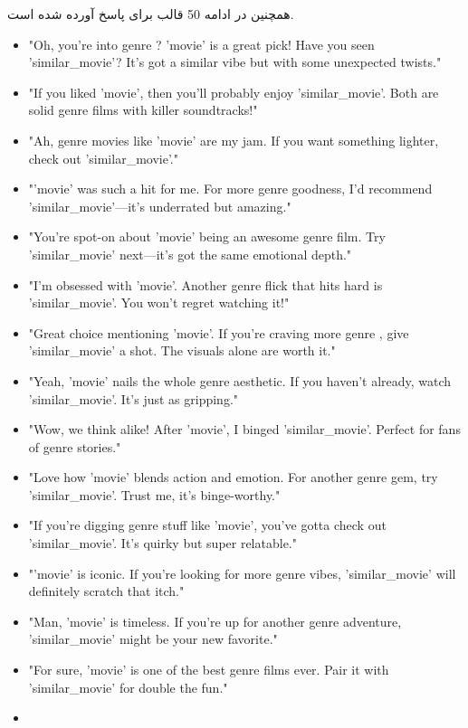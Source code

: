 همچنین در ادامه 50 قالب برای پاسخ آورده شده است.

\begin{LTR}
\begin{itemize}
\item
"Oh, you're into {genre} ? '{movie}' is a great pick! Have you seen '{similar\_movie}'? It's got a similar vibe but with some unexpected twists."
\item
"If you liked '{movie}', then you’ll probably enjoy '{similar\_movie}'. Both are solid {genre} films with killer soundtracks!"
\item
"Ah, {genre} movies like '{movie}' are my jam. If you want something lighter, check out '{similar\_movie}'."
\item
"'{movie}' was such a hit for me. For more {genre} goodness, I’d recommend '{similar\_movie}'—it’s underrated but amazing."
\item
"You’re spot-on about '{movie}' being an awesome {genre} film. Try '{similar\_movie}' next—it’s got the same emotional depth."
\item
"I’m obsessed with '{movie}'. Another {genre} flick that hits hard is '{similar\_movie}'. You won’t regret watching it!"
\item
"Great choice mentioning '{movie}'. If you’re craving more {genre} , give '{similar\_movie}' a shot. The visuals alone are worth it."
\item
"Yeah, '{movie}' nails the whole {genre} aesthetic. If you haven’t already, watch '{similar\_movie}'. It’s just as gripping."
\item
"Wow, we think alike! After '{movie}', I binged '{similar\_movie}'. Perfect for fans of {genre} stories."
\item
"Love how '{movie}' blends action and emotion. For another {genre} gem, try '{similar\_movie}'. Trust me, it’s binge-worthy."
\item
"If you’re digging {genre} stuff like '{movie}', you’ve gotta check out '{similar\_movie}'. It’s quirky but super relatable."
\item
"'{movie}' is iconic. If you’re looking for more {genre} vibes, '{similar\_movie}' will definitely scratch that itch."
\item
"Man, '{movie}' is timeless. If you’re up for another {genre} adventure, '{similar\_movie}' might be your new favorite."
\item
"For sure, '{movie}' is one of the best {genre} films ever. Pair it with '{similar\_movie}' for double the fun."
\item

\end{itemize}
\end{LTR}
